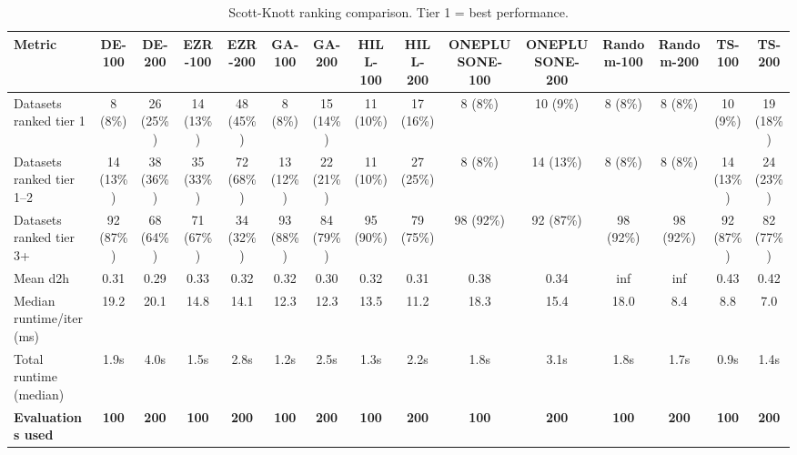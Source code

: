 \begin{table}[t]
\centering
\caption{Scott-Knott ranking comparison. Tier 1 = best performance.}
\label{tab:performance}
\small
\begin{tabular}{lcccccccccccccc}
\toprule
\textbf{Metric} & \textbf{DE-100} & \textbf{DE-200} & \textbf{EZR-100} & \textbf{EZR-200} & \textbf{GA-100} & \textbf{GA-200} & \textbf{HILL-100} & \textbf{HILL-200} & \textbf{ONEPLUSONE-100} & \textbf{ONEPLUSONE-200} & \textbf{Random-100} & \textbf{Random-200} & \textbf{TS-100} & \textbf{TS-200} \\
\midrule
Datasets ranked tier 1 & 8 (8\%) & 26 (25\%) & 14 (13\%) & 48 (45\%) & 8 (8\%) & 15 (14\%) & 11 (10\%) & 17 (16\%) & 8 (8\%) & 10 (9\%) & 8 (8\%) & 8 (8\%) & 10 (9\%) & 19 (18\%) \\
Datasets ranked tier 1--2 & 14 (13\%) & 38 (36\%) & 35 (33\%) & 72 (68\%) & 13 (12\%) & 22 (21\%) & 11 (10\%) & 27 (25\%) & 8 (8\%) & 14 (13\%) & 8 (8\%) & 8 (8\%) & 14 (13\%) & 24 (23\%) \\
Datasets ranked tier 3+ & 92 (87\%) & 68 (64\%) & 71 (67\%) & 34 (32\%) & 93 (88\%) & 84 (79\%) & 95 (90\%) & 79 (75\%) & 98 (92\%) & 92 (87\%) & 98 (92\%) & 98 (92\%) & 92 (87\%) & 82 (77\%) \\
Mean d2h & 0.31 & 0.29 & 0.33 & 0.32 & 0.32 & 0.30 & 0.32 & 0.31 & 0.38 & 0.34 & inf & inf & 0.43 & 0.42 \\
Median runtime/iter (ms) & 19.2 & 20.1 & 14.8 & 14.1 & 12.3 & 12.3 & 13.5 & 11.2 & 18.3 & 15.4 & 18.0 & 8.4 & 8.8 & 7.0 \\
Total runtime (median) & 1.9s & 4.0s & 1.5s & 2.8s & 1.2s & 2.5s & 1.3s & 2.2s & 1.8s & 3.1s & 1.8s & 1.7s & 0.9s & 1.4s \\
\midrule
\textbf{Evaluations used} & \textbf{100} & \textbf{200} & \textbf{100} & \textbf{200} & \textbf{100} & \textbf{200} & \textbf{100} & \textbf{200} & \textbf{100} & \textbf{200} & \textbf{100} & \textbf{200} & \textbf{100} & \textbf{200} \\
\bottomrule
\end{tabular}
\end{table}

